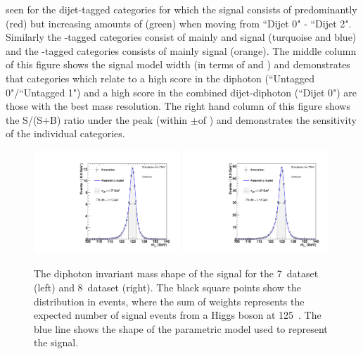 seen for the dijet-tagged categories for which the signal consists of predominantly \VBF (red) but increasing amounts of \ggH (green) when moving from ``Dijet 0" - ``Dijet 2". Similarly the \VH-tagged categories consist of mainly \WH and \ZH signal (turquoise and blue) and the \ttH-tagged categories consists of mainly \ttH signal (orange). The middle column of this figure shows the signal model width (in terms of \sigeff and \sigFW) and demonstrates that categories which relate to a high score in the diphoton \BDT (``Untagged 0"/``Untagged 1") and a high score in the combined dijet-diphoton \BDT (``Dijet 0") are those with the best mass resolution. The right hand column of this figure shows the S/(S+B) ratio under the peak (within $\pm$\sigeff of \mH) and demonstrates the sensitivity of the individual categories.

\begin{figure}
  \begin{center}
    \includegraphics[width=0.49\textwidth]{analysis/plots/ThesisFits/mva_7TeV/all.pdf}
    \includegraphics[width=0.49\textwidth]{analysis/plots/ThesisFits/mva_8TeV/all.pdf}
    \caption[The diphoton invariant mass shape for \SM Higgs signal]{The diphoton invariant mass shape of the \SM signal for the 7~\TeV dataset (left) and 8~\TeV dataset (right). The black square points show the distribution in \MC events, where the sum of weights represents the expected number of signal events from a \SM Higgs boson at 125~\GeV. The blue line shows the shape of the parametric model used to represent the signal.}
    \label{fig:sig_shape}
  \end{center}
\end{figure}

